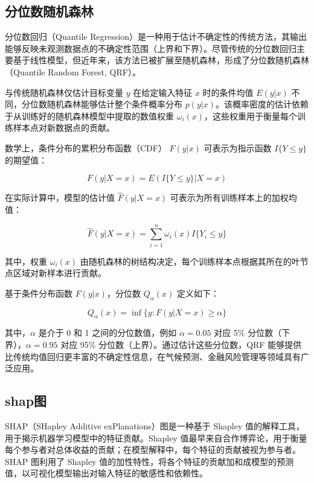 \documentclass[AutoFakeBold]{LZUThesis-PgD&PhD}
\begin{document}
	\subsection{分位数随机森林}
	
	分位数回归（Quantile Regression）是一种用于估计不确定性的传统方法，其输出能够反映未观测数据点的不确定性范围（上界和下界）。尽管传统的分位数回归主要基于线性模型，但近年来，该方法已被扩展至随机森林，形成了分位数随机森林（Quantile Random Forest, QRF）。  
	
	与传统随机森林仅估计目标变量 \( y \) 在给定输入特征 \( x \) 时的条件均值 \( E(y|x) \) 不同，分位数随机森林能够估计整个条件概率分布 \( p(y|x) \)。该概率密度的估计依赖于从训练好的随机森林模型中提取的数值权重 \( \omega_i (x) \)，这些权重用于衡量每个训练样本点对新数据点的贡献。  
	
	数学上，条件分布的累积分布函数（CDF） \( F(y|x) \) 可表示为指示函数 \( I\{Y \leq y\} \) 的期望值：
	
	\begin{equation}
		F(y|X = x) = E (I\{Y \leq y\} |X = x)
	\end{equation}
	
	在实际计算中，模型的估计值 \( \hat{F}(y|X = x) \) 可表示为所有训练样本上的加权均值：
	
	\begin{equation}
		\hat{F}(y|X = x) = \sum_{i=1}^{n} \omega_i (x) I\{Y_i \leq y\}
	\end{equation}
	
	其中，权重 \( \omega_i (x) \) 由随机森林的树结构决定，每个训练样本点根据其所在的叶节点区域对新样本进行贡献。  
	
	基于条件分布函数 \( F(y|x) \)，分位数 \( Q_{\alpha}(x) \) 定义如下：
	
	\begin{equation}
		Q_{\alpha} (x) = \inf \{y : F(y|X = x) \geq \alpha \}
	\end{equation}
	
	其中，\( \alpha \) 是介于 0 和 1 之间的分位数值，例如 \( \alpha = 0.05 \) 对应 5\% 分位数（下界），\( \alpha = 0.95 \) 对应 95\% 分位数（上界）。通过估计这些分位数，QRF 能够提供比传统均值回归更丰富的不确定性信息，在气候预测、金融风险管理等领域具有广泛应用。
	\subsection{shap图}
	
	
	
	
	SHAP（SHapley Additive exPlanations）图是一种基于 Shapley 值的解释工具，用于揭示机器学习模型中的特征贡献。Shapley 值最早来自合作博弈论，用于衡量每个参与者对总体收益的贡献；在模型解释中，每个特征的贡献被视为参与者。SHAP 图利用了 Shapley 值的加性特性，将各个特征的贡献加和成模型的预测值，以可视化模型输出对输入特征的敏感性和依赖性。
	
\end{document}
